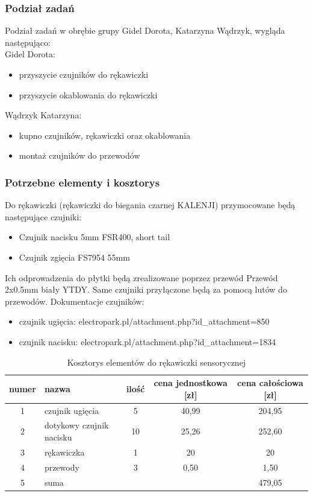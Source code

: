 \documentclass{article}
\begin{document}
\subsubsection{Podział zadań}
Podział zadań w obrębie grupy Gidel Dorota, Katarzyna Wądrzyk, wygląda następująco:\\
Gidel Dorota:
\begin{itemize}
    \item przyszycie czujników do rękawiczki
    \item przyszycie okablowania do rękawiczki
\end{itemize}
Wądrzyk Katarzyna:
\begin{itemize}
    \item kupno czujników, rękawiczki oraz okablowania
    \item montaż czujników do przewodów
\end{itemize}
\subsubsection{Potrzebne elementy i kosztorys}
Do rękawiczki (rękawiczki do biegania czarnej KALENJI) przymocowane będą następujące czujniki:
\begin{itemize}
    \item Czujnik nacisku 5mm FSR400, short tail
    \item Czujnik zgięcia FS7954 55mm
\end{itemize}
Ich odprowadzenia do płytki będą zrealizowane poprzez przewód Przewód 2x0.5mm biały YTDY.
Same czujniki przyłączone będą za pomocą lutów do przewodów.
Dokumentacje czujników:

\begin{itemize}
  \item czujnik ugięcia: electropark.pl/attachment.php?id\textit{\_}attachment=850
  \item czujnik nacisku: electropark.pl/attachment.php?id\textit{\_}attachment=1834

\end{itemize}

\begin{table}[ht!]
\centering
\caption{Kosztorys elementów do rękawiczki sensorycznej}
\begin{tabular}{|c|l|c|c|c|}
\hline
    numer & nazwa & ilość & cena jednostkowa [zł] & cena całościowa [zł] \\
 \hline
    1 & czujnik ugięcia & 5 & 40,99 & 204,95 \\
    2 & dotykowy czujnik nacisku & 10 & 25,26 & 252,60 \\
    3 & rękawiczka & 1 & 20 & 20 \\
    4 & przewody & 3 & 0,50 & 1,50 \\
    \hline
    5 & suma & & & 479,05\\
    \hline
\end{tabular}
\label{tab:rekawiczka}
\end{table}
\end{document}
